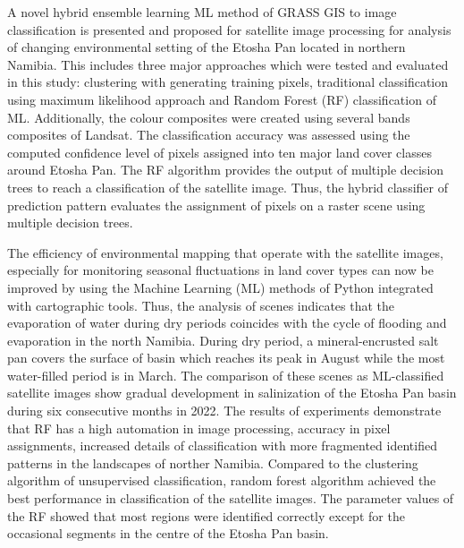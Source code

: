 \documentclass[climate,article,submit,pdftex,moreauthors]{Definitions/mdpi}
\begin{document}
A novel hybrid ensemble learning ML method of GRASS GIS to image classification is presented and proposed for satellite image processing for analysis of changing environmental setting of the Etosha Pan located in northern Namibia. This includes three major approaches which were tested and evaluated in this study: clustering with generating training pixels, traditional classification using maximum likelihood approach and Random Forest (RF) classification of ML. Additionally, the colour composites were created using several bands composites of Landsat. The classification accuracy was assessed using the computed confidence level of pixels assigned into ten major land cover classes around Etosha Pan. The RF algorithm provides the output of multiple decision trees to reach a classification of the satellite image. Thus, the hybrid classifier of prediction pattern evaluates the assignment of pixels on a raster scene using multiple decision trees.

The efficiency of environmental mapping that operate with the satellite images, especially for monitoring seasonal fluctuations in land cover types can now be improved by using the Machine Learning (ML) methods of Python integrated with cartographic tools. Thus, the analysis of scenes indicates that the evaporation of water during dry periods coincides with the cycle of flooding and evaporation in the north Namibia. During dry period, a mineral-encrusted salt pan covers the surface of basin which reaches its peak in August while the most water-filled period is in March. The comparison of these scenes as ML-classified satellite images show gradual development in salinization of the Etosha Pan basin during six consecutive months in 2022. The results of experiments demonstrate that RF has a high automation in image processing, accuracy in pixel assignments, increased details of classification with more fragmented identified patterns in the landscapes of norther Namibia. Compared to the clustering algorithm of unsupervised classification, random forest algorithm achieved the best performance in classification of the satellite images. The parameter values of the RF showed that most regions were identified correctly except for the occasional segments in the centre of the Etosha Pan basin.
\end{document}
